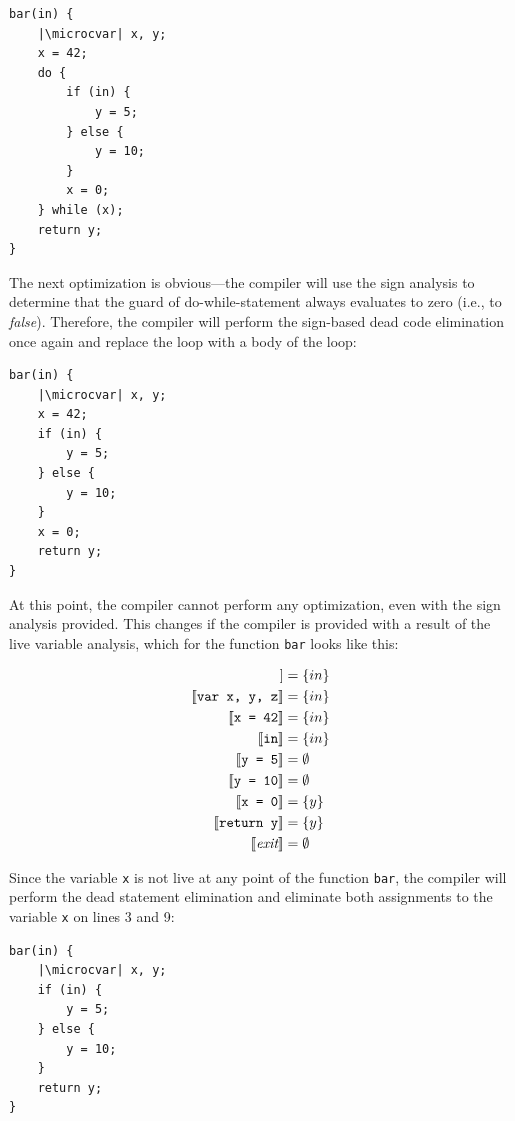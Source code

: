 \documentclass[thesis=M,english]{FITthesis}[2019/12/23]
\newcommand{\microcvar}{\textcolor{codegreen}{\textbf{var}}}
\begin{document}
\begin{verbatim}
bar(in) {
	|\microcvar| x, y;
	x = 42;
	do {
		if (in) {
			y = 5;
		} else {
			y = 10;
		}
		x = 0;
	} while (x);
	return y;
}
\end{verbatim}

The next optimization is obvious---the compiler will use the sign analysis to determine that the guard of do-while-statement always evaluates to zero (i.e., to \emph{false}). Therefore, the compiler will perform the sign-based dead code elimination once again and replace the loop with a body of the loop: 

\begin{verbatim}
bar(in) {
	|\microcvar| x, y;
	x = 42;
	if (in) {
		y = 5;
	} else {
		y = 10;
	}
	x = 0;
	return y;
}
\end{verbatim}

At this point, the compiler cannot perform any optimization, even with the sign analysis provided. This changes if the compiler is provided with a result of the live variable analysis, which for the function \texttt{bar} looks like this:

\begin{align*}
    [\![ \emph{entry} ]\!] &= \{ in \}\\
    [\![ \texttt{var x, y, z} ]\!] &= \{ in \}\\
    [\![ \texttt{x = 42} ]\!] &= \{ in \}\\
    [\![ \texttt{in} ]\!] &= \{ in \}\\
    [\![ \texttt{y = 5} ]\!] &= \emptyset\\
    [\![ \texttt{y = 10} ]\!] &= \emptyset\\
    [\![ \texttt{x = 0} ]\!] &= \{ y \}\\
    [\![ \texttt{return y} ]\!] &= \{ y \}\\
    [\![ \emph{exit} ]\!] &= \emptyset\\
\end{align*}

Since the variable \texttt{x} is not live at any point of the function \texttt{bar}, the compiler will perform the dead statement elimination and eliminate both assignments to the variable \texttt{x} on lines 3 and 9:

\begin{verbatim}
bar(in) {
	|\microcvar| x, y;
	if (in) {
		y = 5;
	} else {
		y = 10;
	}
	return y;
}
\end{verbatim}
\end{document}
